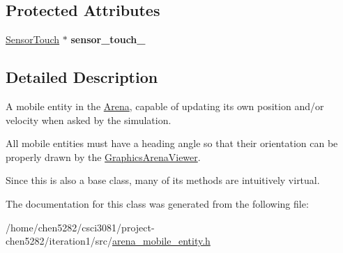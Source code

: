 \subsection*{Protected Attributes}
\begin{DoxyCompactItemize}
\item 
\hyperlink{classSensorTouch}{Sensor\+Touch} $\ast$ {\bfseries sensor\+\_\+touch\+\_\+}\hypertarget{classArenaMobileEntity_a260fd3fba196ee9ab56f9f2ce6ab4a21}{}\label{classArenaMobileEntity_a260fd3fba196ee9ab56f9f2ce6ab4a21}

\end{DoxyCompactItemize}


\subsection{Detailed Description}
A mobile entity in the \hyperlink{classArena}{Arena}, capable of updating its own position and/or velocity when asked by the simulation. 

All mobile entities must have a heading angle so that their orientation can be properly drawn by the \hyperlink{classGraphicsArenaViewer}{Graphics\+Arena\+Viewer}.

Since this is also a base class, many of its methods are intuitively {\ttfamily virtual}. 

The documentation for this class was generated from the following file\+:\begin{DoxyCompactItemize}
\item 
/home/chen5282/csci3081/project-\/chen5282/iteration1/src/\hyperlink{arena__mobile__entity_8h}{arena\+\_\+mobile\+\_\+entity.\+h}\end{DoxyCompactItemize}

